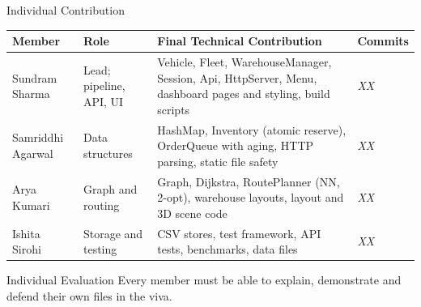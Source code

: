 \documentclass[aspectratio=169,11pt]{beamer}
\newcommand{\todo}[1]{\textit{\color{red}#1}}
\begin{document}
\begin{frame}{Individual Contribution}
\scriptsize
\begin{center}
\renewcommand{\arraystretch}{1.05}
\begin{tabularx}{.96\textwidth}{@{}p{1.8cm}p{1.9cm}X p{1.5cm}@{}}
\toprule
Member & Role & Final Technical Contribution & Commits\\
\midrule
Sundram Sharma & Lead; pipeline, API, UI & Vehicle, Fleet, WarehouseManager, Session, Api, HttpServer, Menu, dashboard pages and styling, build scripts & \todo{XX}\\
Samriddhi Agarwal & Data structures & HashMap, Inventory (atomic reserve), OrderQueue with aging, HTTP parsing, static file safety & \todo{XX}\\
Arya Kumari & Graph and routing & Graph, Dijkstra, RoutePlanner (NN, 2-opt), warehouse layouts, layout and 3D scene code & \todo{XX}\\
Ishita Sirohi & Storage and testing & CSV stores, test framework, API tests, benchmarks, data files & \todo{XX}\\
\bottomrule
\end{tabularx}
\end{center}
\vspace{2mm}
\begin{block}{Individual Evaluation}
Every member must be able to explain, demonstrate and defend their own files in the viva.
\end{block}
\end{frame}
\end{document}
